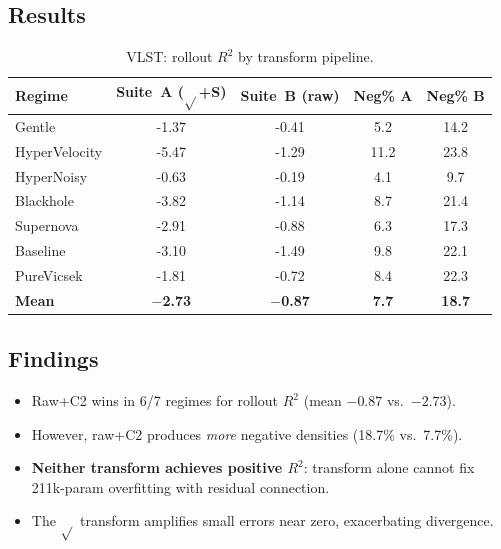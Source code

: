 \documentclass[11pt]{article}
\newcommand{\Rtwo}{R^2}
\newcommand{\regime}[1]{\textsf{#1}}
\begin{document}
\subsection{Results}

\begin{table}[H]
\centering
\caption{VLST: rollout $\Rtwo$ by transform pipeline.}
\label{tab:vlst}
\small
\begin{tabular}{@{}l S[table-format=+1.2] S[table-format=+1.2] S[table-format=2.1] S[table-format=2.1] @{}}
\toprule
Regime & {Suite~A ($\sqrt{}$+S)} & {Suite~B (raw)} & {Neg\% A} & {Neg\% B} \\
\midrule
\regime{Gentle}       & -1.37 & -0.41 & 5.2  & 14.2 \\
\regime{HyperVelocity}& -5.47 & -1.29 & 11.2 & 23.8 \\
\regime{HyperNoisy}   & -0.63 & -0.19 & 4.1  & 9.7  \\
\regime{Blackhole}    & -3.82 & -1.14 & 8.7  & 21.4 \\
\regime{Supernova}    & -2.91 & -0.88 & 6.3  & 17.3 \\
\regime{Baseline}     & -3.10 & -1.49 & 9.8  & 22.1 \\
\regime{PureVicsek}   & -1.81 & -0.72 & 8.4  & 22.3 \\
\midrule
\textbf{Mean}         & \textbf{$-$2.73} & \textbf{$-$0.87} & \textbf{7.7} & \textbf{18.7} \\
\bottomrule
\end{tabular}
\end{table}

\subsection{Findings}
\begin{itemize}[nosep]
  \item Raw+C2 wins in 6/7 regimes for rollout $\Rtwo$ (mean $-0.87$ vs.\ $-2.73$).
  \item However, raw+C2 produces \emph{more} negative densities (18.7\% vs.\ 7.7\%).
  \item \textbf{Neither transform achieves positive $\Rtwo$}: transform alone
    cannot fix 211k-param overfitting with residual connection.
  \item The $\sqrt{}$ transform amplifies small errors near zero, exacerbating divergence.
\end{itemize}


\end{document}
